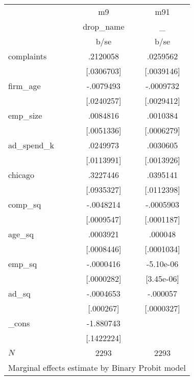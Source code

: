 \begin{tabular}{l*{2}{c}}
            &          m9&         m91\\
            &   drop\_name&           \_\\
            &        b/se&        b/se\\
complaints  &    .2120058&    .0259562\\
            &  [.0306703]&  [.0039146]\\
firm\_age    &   -.0079493&   -.0009732\\
            &  [.0240257]&  [.0029412]\\
emp\_size    &    .0084816&    .0010384\\
            &  [.0051336]&  [.0006279]\\
ad\_spend\_k  &    .0249973&    .0030605\\
            &  [.0113991]&  [.0013926]\\
chicago     &    .3227446&    .0395141\\
            &  [.0935327]&  [.0112398]\\
comp\_sq     &   -.0048214&   -.0005903\\
            &  [.0009547]&  [.0001187]\\
age\_sq      &    .0003921&     .000048\\
            &  [.0008446]&  [.0001034]\\
emp\_sq      &   -.0000416&   -5.10e-06\\
            &  [.0000282]&  [3.45e-06]\\
ad\_sq       &   -.0004653&    -.000057\\
            &   [.000267]&  [.0000327]\\
\_cons      &   -1.880743&            \\
            &  [.1422224]&            \\
\(N\)       &        2293&        2293\\
\multicolumn{3}{l}{\footnotesize  Marginal effects estimate by Binary Probit model}\\
\end{tabular}
